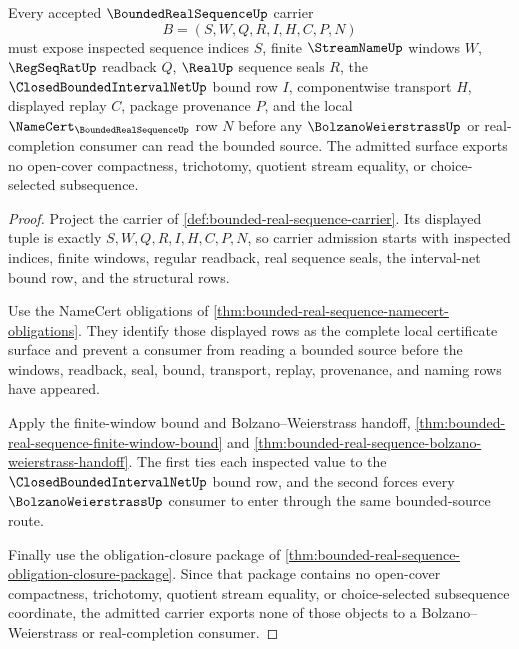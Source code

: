 \begin{theorem}
\label{thm:bounded-real-sequence-obligation-carrier-admission}
Every accepted $\BoundedRealSequenceUp$ carrier
$$
B=(S,W,Q,R,I,H,C,P,N)
$$
must expose inspected sequence indices $S$, finite $\StreamNameUp$ windows $W$, $\RegSeqRatUp$ readback $Q$, $\RealUp$ sequence seals $R$, the $\ClosedBoundedIntervalNetUp$ bound row $I$, componentwise transport $H$, displayed replay $C$, package provenance $P$, and the local $\NameCert_{\BoundedRealSequenceUp}$ row $N$ before any $\BolzanoWeierstrassUp$ or real-completion consumer can read the bounded source. The admitted surface exports no open-cover compactness, trichotomy, quotient stream equality, or choice-selected subsequence.
\end{theorem}
\begin{proof}
Project the carrier of \autoref{def:bounded-real-sequence-carrier}. Its displayed tuple is exactly $S,W,Q,R,I,H,C,P,N$, so carrier admission starts with inspected indices, finite windows, regular readback, real sequence seals, the interval-net bound row, and the structural rows.

Use the NameCert obligations of \autoref{thm:bounded-real-sequence-namecert-obligations}. They identify those displayed rows as the complete local certificate surface and prevent a consumer from reading a bounded source before the windows, readback, seal, bound, transport, replay, provenance, and naming rows have appeared.

Apply the finite-window bound and Bolzano--Weierstrass handoff, \autoref{thm:bounded-real-sequence-finite-window-bound} and \autoref{thm:bounded-real-sequence-bolzano-weierstrass-handoff}. The first ties each inspected value to the $\ClosedBoundedIntervalNetUp$ bound row, and the second forces every $\BolzanoWeierstrassUp$ consumer to enter through the same bounded-source route.

Finally use the obligation-closure package of \autoref{thm:bounded-real-sequence-obligation-closure-package}. Since that package contains no open-cover compactness, trichotomy, quotient stream equality, or choice-selected subsequence coordinate, the admitted carrier exports none of those objects to a Bolzano--Weierstrass or real-completion consumer.
\end{proof}

